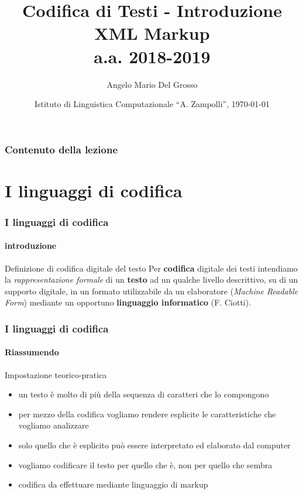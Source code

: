 \documentclass{beamer}
\title{Codifica di Testi - Introduzione XML Markup \\a.a. 2018-2019}
\author[A.M. Del Grosso]{Angelo Mario Del Grosso}
\institute{\texttt{angelo.delgrosso@ilc.cnr.it} \\\bigskip\textit{CNR-ILC-LicoLab}}
\date{Istituto di Linguistica Computazionale ``A. Zampolli'', \today}
\begin{document}
\begin{frame}
	\maketitle
\end{frame}

\begin{frame}
	\frametitle{Contenuto della lezione}
	\tableofcontents
\end{frame}

\section{I linguaggi di codifica}
\begin{frame}
	\frametitle{I linguaggi di codifica}
	\framesubtitle{introduzione}
	\addtocounter{nframe}{1}

	\begin{block}{Definizione di codifica digitale del testo}
		Per \textbf{codifica} digitale dei testi intendiamo la \textit{rappresentazione formale} di un \textbf{testo} ad un qualche livello descrittivo, su di un supporto digitale, in un formato utilizzabile da un elaboratore (\textit{Machine Readable Form}) mediante un opportuno \textbf{linguaggio informatico} (F. Ciotti).
	\end{block}

\end{frame}

\begin{frame}
	\frametitle{I linguaggi di codifica}
	\framesubtitle{Riassumendo}
	\addtocounter{nframe}{1}

	\begin{block}{Impostazione teorico-pratica}

		\begin{itemize}
			\item  un testo è molto di più della sequenza di caratteri che lo
			      compongono
			\item per mezzo della codifica vogliamo rendere esplicite le
			      caratteristiche che vogliamo analizzare
			\item  solo quello che è esplicito può essere interpretato ed
			      elaborato dal computer
			\item vogliamo codificare il testo per quello che è, non per quello che
			      sembra
			\item codifica da effettuare mediante linguaggio di markup
		\end{itemize}

	\end{block}

\end{frame}
\end{document}
